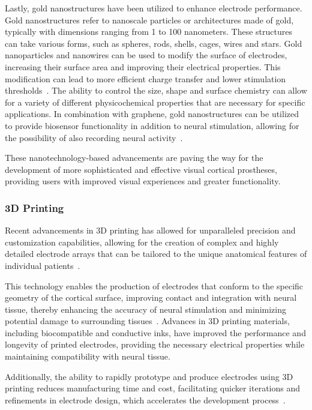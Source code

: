 \documentclass[twocolumn,10pt]{article}
\begin{document}
Lastly, gold nanostructures have been utilized to enhance electrode performance.
Gold nanostructures refer to nanoscale particles or architectures made of gold,
typically with dimensions ranging from 1 to 100 nanometers. These structures can
take various forms, such as spheres, rods, shells, cages, wires and stars. Gold
nanoparticles and nanowires can be used to modify the surface of electrodes,
increasing their surface area and improving their electrical properties. This
modification can lead to more efficient charge transfer and lower stimulation
thresholds~\parencite{zareGoldNanostructuresSynthesis2022}. The ability to
control the size, shape and surface chemistry can allow for a variety of
different physicochemical properties that are necessary for specific
applications. In combination with graphene, gold nanostructures can be utilized
to provide biosensor functionality in addition to neural stimulation, allowing
for the possibility of also recording neural
activity~\parencite{raufGoldNanostructuredLaserscribed2021}.

These nanotechnology-based advancements are paving the way for the development
of more sophisticated and effective visual cortical prostheses, providing users
with improved visual experiences and greater functionality.

\subsubsection*{3D Printing}
Recent advancements in 3D printing has allowed for unparalleled precision and
customization capabilities, allowing for the creation of complex and highly
detailed electrode arrays that can be tailored to the unique anatomical features
of individual patients~\parencite{guoImplantableLiquidMetalbased2017}.

This technology enables the production of electrodes that conform to the
specific geometry of the cortical surface, improving contact and integration
with neural tissue, thereby enhancing the accuracy of neural stimulation and
minimizing potential damage to surrounding
tissues~\parencite{liuSoftElasticHydrogelbased2019}. Advances in 3D printing
materials, including biocompatible and conductive inks, have improved the
performance and longevity of printed electrodes, providing the necessary
electrical properties while maintaining compatibility with neural tissue.

Additionally, the ability to rapidly prototype and produce electrodes using 3D
printing reduces manufacturing time and cost, facilitating quicker iterations
and refinements in electrode design, which accelerates the development
process~\parencite{zhangClimbinginspiredTwiningElectrodes2019}.
\end{document}
